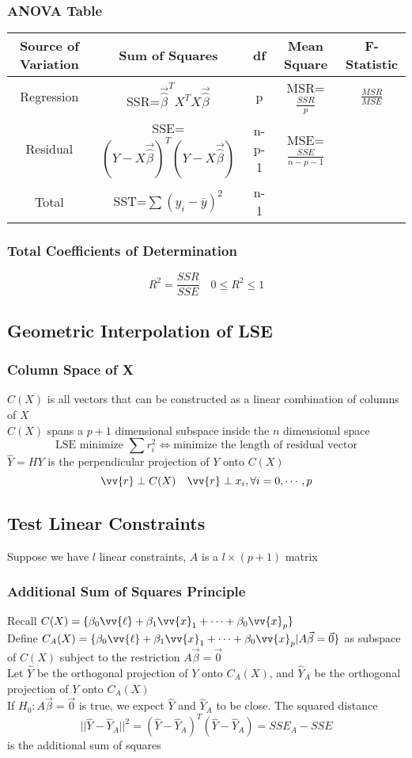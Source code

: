 \documentclass[11pt]{article}
\newcommand{\vl}{\vv{\ell}}
\newcommand{\vr}{\vv{r}}
\newcommand{\vx}{\vv{x}}
\begin{document}
\subsubsection{ANOVA Table}
\begin{tabular}{c|c|c|c|c}
    Source of Variation & Sum of Squares & df & Mean Square & F-Statistic \\ \hline
    Regression & SSR=$\vec{\hat{\beta}}^TX^TX\vec{\hat{\beta}}$ & p & MSR=$\frac{SSR}{p}$ & $\frac{MSR}{MSE}$ \\
    Residual & SSE=$(Y-X\vec{\hat{\beta}})^T(Y-X\vec{\hat{\beta}})$ & n-p-1 & MSE=$\frac{SSE}{n-p-1}$ & \\
    Total & SST=$\sum(y_i-\overline{y})^2$ & n-1 & &
\end{tabular}
\subsubsection{Total Coefficients of Determination}
\[R^2=\frac{SSR}{SSE}\quad 0\leq R^2\leq1\]
\subsection{Geometric Interpolation of LSE}
\subsubsection{Column Space of X}
$C(X)$ is all vectors that can be constructed as a linear combination of columns of $X$ \\
$C(X)$ spans a $p+1$ dimensional subspace inside the $n$ dimensional space 
\[\text{LSE minimize }\sum r_i^2\iff \text{minimize the length of residual vector}\]
$\hat{Y}=HY$ is the perpendicular projection of $Y$ onto $C(X)$
\[\vr\perp C(X)\quad \vr\perp x_i, \forall i=0,\cdots,p\]
\subsection{Test Linear Constraints}
Suppose we have $l$ linear constraints, $A$ is a $l\times(p+1)$ matrix 
\subsubsection{Additional Sum of Squares Principle}
Recall $C(X) = \{\beta_0\vl + \beta_1\vx_1 + \cdots+ \beta_0\vx_p\}$ \\
Define $C_A(X) = \{\beta_0\vl + \beta_1\vx_1 + \cdots+ \beta_0\vx_p|A\vec{\beta}=\vec{0}\}$ as subspace of $C(X)$ subject to the 
restriction $A\vec{\beta}=\vec{0}$ \\
Let $\hat{Y}$ be the orthogonal projection of $Y$ onto $C_A(X)$, and $\hat{Y}_A$ be the orthogonal projection of $Y$ onto $C_A(X)$ \\
If $H_0:A\vec{\beta}=\vec{0}$ is true, we expect $\hat{Y}$ and $\hat{Y}_A$ to be close. The squared distance
\[||\hat{Y}-\hat{Y}_A||^2 = (\hat{Y}-\hat{Y}_A)^T(\hat{Y}-\hat{Y}_A) = SSE_A-SSE\]
is the additional sum of squares 
\end{document}
